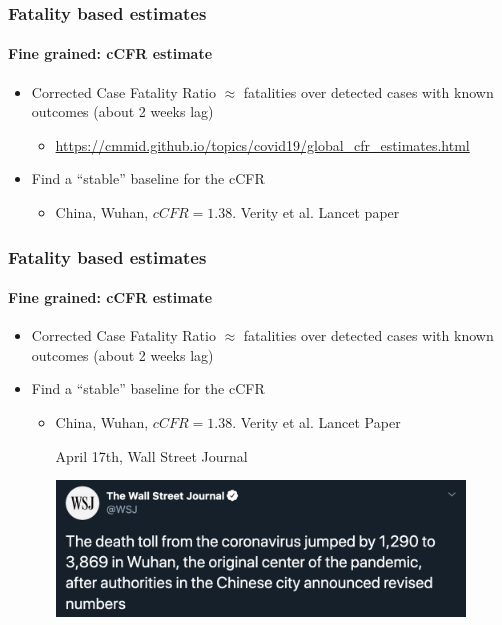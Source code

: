 \documentclass{beamer}
\begin{document}
\begin{frame}
  \frametitle{Fatality based estimates}
  \framesubtitle{Fine grained: cCFR estimate}
  \begin{itemize}
    \item Corrected Case Fatality Ratio $\approx$ fatalities over detected cases with known outcomes (about 2 weeks lag)
      \begin{itemize}
      \item \url{https://cmmid.github.io/topics/covid19/global_cfr_estimates.html}
      \end{itemize}

    \item Find a ``stable'' baseline for the cCFR 
      \begin{itemize}
        \item China, Wuhan, $cCFR=1.38$.  Verity et al. Lancet paper
      \end{itemize}
  \end{itemize}
\end{frame}

\begin{frame}
  \frametitle{Fatality based estimates}
  \framesubtitle{Fine grained: cCFR estimate}
  \begin{itemize}
    \item Corrected Case Fatality Ratio $\approx$ fatalities over detected cases with known outcomes (about 2 weeks lag)
    \item Find a ``stable'' baseline for the cCFR 
      \begin{itemize}
        \item China, Wuhan, $cCFR=1.38$.  Verity et al. Lancet Paper 
          \begin{block}{April 17th, Wall Street Journal}
          \begin{center}
          \includegraphics[width=0.9\textwidth]{WSJ.png}
          \end{center}
          \end{block}
      \end{itemize}
  \end{itemize}
\end{frame}
\end{document}
